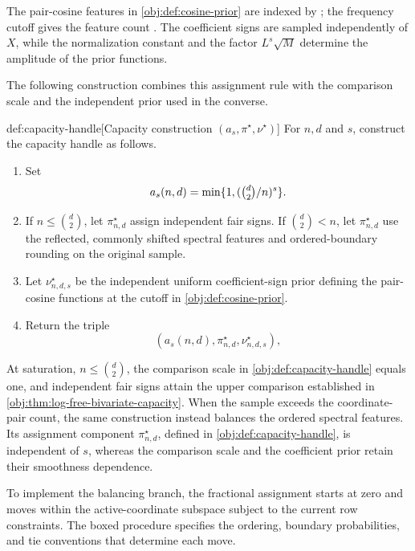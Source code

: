 \documentclass[11pt]{article}
\begin{document}
The pair-cosine features  in \cref{obj:def:cosine-prior} are indexed by ; the frequency cutoff  gives the feature count . The coefficient signs  are sampled independently of \(X\), while the normalization constant  and the factor \(L^s\sqrt M\) determine the amplitude of the prior functions.

The following construction combines this assignment rule with the comparison scale and the independent prior used in the converse.

\begin{algorithmv}{def:capacity-handle}[Capacity construction \((a_s,\pi^\star,\nu^\star)\)]
For \(n,d\) and \(s\), construct the capacity handle as follows.
\begin{enumerate}
\item Set
\[
a_s(n,d)=\min\{1,(\tbinom d2/n)^s\}.
\]
\item If \(n\leq\binom d2\), let \(\pi^\star_{n,d}\) assign independent fair signs. If \(\binom d2<n\), let \(\pi^\star_{n,d}\) use the reflected, commonly shifted spectral features and ordered-boundary rounding on the original sample.
\item Let \(\nu^\star_{n,d,s}\) be the independent uniform coefficient-sign prior defining the pair-cosine functions at the cutoff in \cref{obj:def:cosine-prior}.
\item Return the triple
\[
(a_s(n,d),\pi^\star_{n,d},\nu^\star_{n,d,s}),
\]
\end{enumerate}
\end{algorithmv}

At saturation, \(n\leq\binom d2\), the comparison scale in \cref{obj:def:capacity-handle} equals one, and independent fair signs attain the upper comparison established in \cref{obj:thm:log-free-bivariate-capacity}. When the sample exceeds the coordinate-pair count, the same construction instead balances the ordered spectral features. Its assignment component \(\pi^\star_{n,d}\), defined in \cref{obj:def:capacity-handle}, is independent of \(s\), whereas the comparison scale and the coefficient prior retain their smoothness dependence.

To implement the balancing branch, the fractional assignment starts at zero and moves within the active-coordinate subspace subject to the current row constraints. The boxed procedure specifies the ordering, boundary probabilities, and tie conventions that determine each move.
\end{document}
